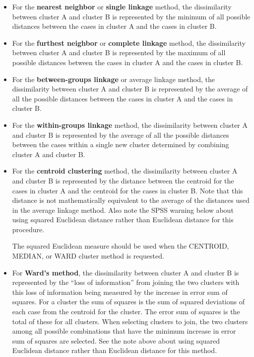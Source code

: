 \documentclass[a4paper,12pt]{article}
\begin{document}
\begin{itemize}
\item For the \textbf{nearest neighbor} or \textbf{single linkage} method, the dissimilarity between cluster A and cluster B is represented by the minimum of all possible distances between the cases in cluster A and the cases in cluster B.

\item For the \textbf{furthest neighbor} or \textbf{complete linkage} method, the dissimilarity between cluster A and cluster B is represented by the maximum of all possible distances between the cases in cluster A and the cases in cluster B.

\item For the \textbf{between-groups linkage} or average linkage method, the dissimilarity between cluster A and cluster B is represented by the average of all the possible distances between the cases in cluster A and the cases in cluster B.

\item For the \textbf{within-groups linkage} method, the dissimilarity between cluster A and cluster B is represented by the average of all the possible distances between the cases within a single new cluster determined by combining cluster A and cluster B.
 
\item  
For the \textbf{centroid clustering} method, the dissimilarity between cluster A and cluster B is represented by the distance between the centroid for the cases in cluster A and the centroid for the cases in cluster B.  Note that this distance is not mathematically equivalent to the average of the distances used in the average linkage method.  Also note the SPSS warning below about using squared Euclidean distance rather than Euclidean distance for this procedure.

\begin{framed}
The squared Euclidean measure should be used when the CENTROID, MEDIAN, or WARD cluster method is requested.
\end{framed}

\item For \textbf{Ward’s method}, the dissimilarity between cluster A and cluster B is represented by the “loss of information” from joining the two clusters with this loss of information being measured by the increase in error sum of squares.  For a cluster the sum of squares is the sum of squared deviations of each case from the centroid for the cluster.  The error sum of squares is the total of these for all clusters.  When selecting clusters to join, the two clusters among all possible combinations that have the minimum increase in error sum of squares are selected.  See the note above about using squared Euclidean distance rather than Euclidean distance for this method.


\end{itemize}
\end{document}
